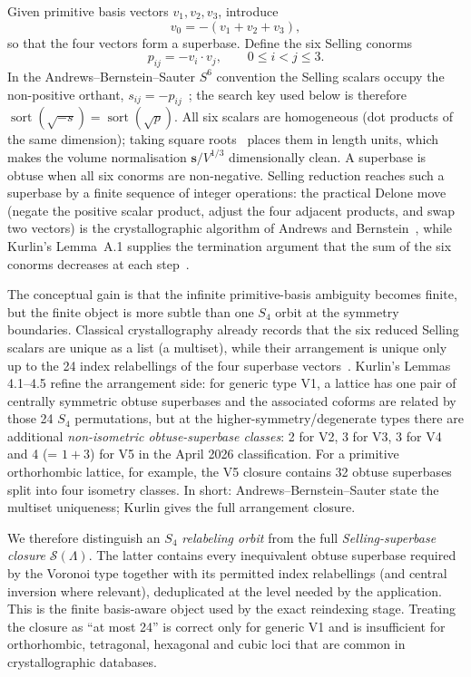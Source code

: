 \documentclass[11pt]{article}
\newcommand{\sortkey}{\mathbf{s}}
\newcommand{\Sclosure}{\mathcal{S}}
\begin{document}
Given primitive basis vectors $v_1,v_2,v_3$, introduce
\begin{equation}
v_0 = -(v_1+v_2+v_3),
\end{equation}
so that the four vectors form a superbase. Define the six Selling conorms
\begin{equation}
p_{ij} = -v_i\cdot v_j, \qquad 0\le i<j\le 3.
\end{equation}
In the Andrews--Bernstein--Sauter $S^6$ convention the Selling scalars occupy the non-positive orthant, $s_{ij}=-p_{ij}$~\cite{abs2019}; the search key used below is therefore $\operatorname{sort}(\sqrt{-s})=\operatorname{sort}(\sqrt{p})$. All six scalars are homogeneous (dot products of the same dimension); taking square roots~\cite{kurlin2026} places them in length units, which makes the volume normalisation $\sortkey/V^{1/3}$ dimensionally clean. A superbase is obtuse when all six conorms are non-negative. Selling reduction reaches such a superbase by a finite sequence of integer operations: the practical Delone move (negate the positive scalar product, adjust the four adjacent products, and swap two vectors) is the crystallographic algorithm of Andrews and Bernstein~\cite{ab1988,ab2014,abs2019}, while Kurlin's Lemma~A.1 supplies the termination argument that the sum of the six conorms decreases at each step~\cite{kurlin2026}.

The conceptual gain is that the infinite primitive-basis ambiguity becomes finite, but the finite object is more subtle than one $S_4$ orbit at the symmetry boundaries. Classical crystallography already records that the six reduced Selling scalars are unique as a list (a multiset), while their arrangement is unique only up to the 24 index relabellings of the four superbase vectors~\cite{bravais1850,delone1932,abs2019}. Kurlin's Lemmas 4.1--4.5 refine the arrangement side: for generic type V1, a lattice has one pair of centrally symmetric obtuse superbases and the associated coforms are related by those 24 $S_4$ permutations, but at the higher-symmetry/degenerate types there are additional \emph{non-isometric obtuse-superbase classes}: 2 for V2, 3 for V3, 3 for V4 and 4 (= $1+3$) for V5 in the April 2026 classification. For a primitive orthorhombic lattice, for example, the V5 closure contains 32 obtuse superbases split into four isometry classes. In short: Andrews--Bernstein--Sauter state the multiset uniqueness; Kurlin gives the full arrangement closure.

We therefore distinguish an $S_4$ \emph{relabeling orbit} from the full \emph{Selling-superbase closure} $\Sclosure(\Lambda)$. The latter contains every inequivalent obtuse superbase required by the Voronoi type together with its permitted index relabellings (and central inversion where relevant), deduplicated at the level needed by the application. This is the finite basis-aware object used by the exact reindexing stage. Treating the closure as ``at most 24'' is correct only for generic V1 and is insufficient for orthorhombic, tetragonal, hexagonal and cubic loci that are common in crystallographic databases.
\end{document}
